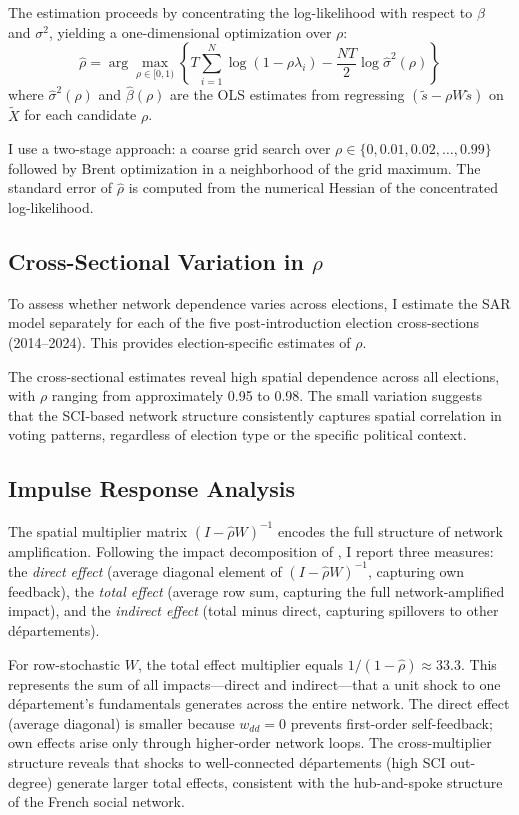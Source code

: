 \documentclass[12pt]{article}
\newcommand{\dept}{d\'{e}partement}
\newcommand{\depts}{d\'{e}partements}
\begin{document}
The estimation proceeds by concentrating the log-likelihood with respect to $\beta$ and $\sigma^2$, yielding a one-dimensional optimization over $\rho$:
\begin{equation}
\hat{\rho} = \arg\max_{\rho \in [0, 1)} \left\{ T \sum_{i=1}^{N} \log(1 - \rho \lambda_i) - \frac{NT}{2} \log \hat{\sigma}^2(\rho) \right\}
\end{equation}
where $\hat{\sigma}^2(\rho)$ and $\hat{\beta}(\rho)$ are the OLS estimates from regressing $(\tilde{s} - \rho W \tilde{s})$ on $\tilde{X}$ for each candidate $\rho$.

I use a two-stage approach: a coarse grid search over $\rho \in \{0, 0.01, 0.02, \ldots, 0.99\}$ followed by Brent optimization in a neighborhood of the grid maximum. The standard error of $\hat{\rho}$ is computed from the numerical Hessian of the concentrated log-likelihood.

\subsection{Cross-Sectional Variation in $\rho$}

To assess whether network dependence varies across elections, I estimate the SAR model separately for each of the five post-introduction election cross-sections (2014--2024). This provides election-specific estimates of $\rho$.

The cross-sectional estimates reveal high spatial dependence across all elections, with $\rho$ ranging from approximately 0.95 to 0.98. The small variation suggests that the SCI-based network structure consistently captures spatial correlation in voting patterns, regardless of election type or the specific political context.

\subsection{Impulse Response Analysis}

The spatial multiplier matrix $(I - \hat{\rho} W)^{-1}$ encodes the full structure of network amplification. Following the impact decomposition of \citet{lesage2009introduction}, I report three measures: the \textit{direct effect} (average diagonal element of $(I - \hat{\rho}W)^{-1}$, capturing own feedback), the \textit{total effect} (average row sum, capturing the full network-amplified impact), and the \textit{indirect effect} (total minus direct, capturing spillovers to other \depts{}).

For row-stochastic $W$, the total effect multiplier equals $1/(1-\hat{\rho}) \approx 33.3$. This represents the sum of all impacts---direct and indirect---that a unit shock to one \dept{}'s fundamentals generates across the entire network. The direct effect (average diagonal) is smaller because $w_{dd} = 0$ prevents first-order self-feedback; own effects arise only through higher-order network loops. The cross-multiplier structure reveals that shocks to well-connected \depts{} (high SCI out-degree) generate larger total effects, consistent with the hub-and-spoke structure of the French social network.
\end{document}
